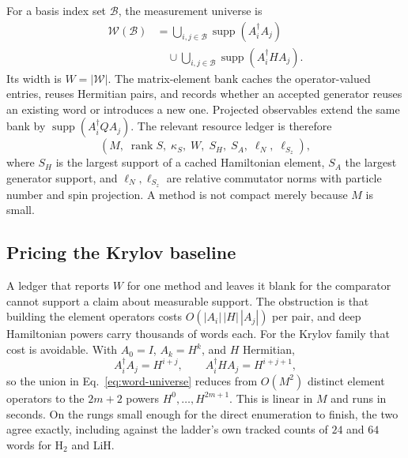 \documentclass[aps,pra,reprint,superscriptaddress,nofootinbib,floatfix]{revtex4-2}
\newcommand{\supp}{\operatorname{supp}}
\newcommand{\rank}{\operatorname{rank}}
\begin{document}
For a basis index set $\mathcal B$, the measurement universe is
\begin{align}
 \mathcal W(\mathcal B)
 &=
 \bigcup_{i,j\in\mathcal B}\supp(A_i^\dagger A_j)
 \nonumber\\
 &\quad\cup
 \bigcup_{i,j\in\mathcal B}\supp(A_i^\dagger H A_j).
 \label{eq:word-universe}
\end{align}
Its width is $W=|\mathcal W|$.
The matrix-element bank caches the operator-valued entries, reuses Hermitian
pairs, and records whether an accepted generator reuses an existing word or
introduces a new one.  Projected observables extend the same bank by
$\supp(A_i^\dagger Q A_j)$.  The relevant resource ledger is therefore
\begin{equation}
 (M,\;\rank S,\;\kappa_S,\;W,\;S_H,\;S_A,\;\ell_N,\;\ell_{S_z}),
 \label{eq:ledger}
\end{equation}
where $S_H$ is the largest support of a cached Hamiltonian element, $S_A$ the
largest generator support, and $\ell_N,\ell_{S_z}$ are relative commutator
norms with particle number and spin projection.  A method is not compact merely
because $M$ is small.

\subsection{Pricing the Krylov baseline}
\label{sec:krylov-width}

A ledger that reports $W$ for one method and leaves it blank for the
comparator cannot support a claim about measurable support.  The obstruction is
that building the element operators costs $O(|A_i|\,|H|\,|A_j|)$ per pair, and
deep Hamiltonian powers carry thousands of words each.  For the Krylov family
that cost is avoidable.  With $A_0=I$, $A_k=H^k$, and $H$ Hermitian,
\begin{equation}
 A_i^\dagger A_j = H^{i+j},\qquad
 A_i^\dagger H A_j = H^{i+j+1},
 \label{eq:krylov-collapse}
\end{equation}
so the union in Eq.~\eqref{eq:word-universe} reduces from $O(M^2)$ distinct
element operators to the $2m+2$ powers $H^0,\dots,H^{2m+1}$.  This is linear in
$M$ and runs in seconds.  On the rungs small enough for the direct enumeration
to finish, the two agree exactly, including against the ladder's own tracked
counts of $24$ and $64$ words for H$_2$ and LiH.
\end{document}
